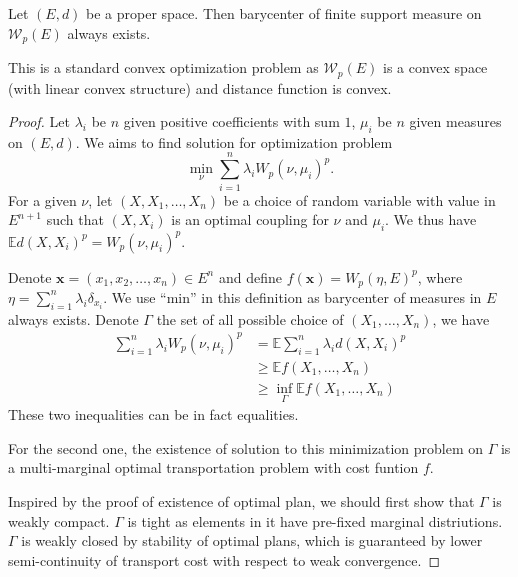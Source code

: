 \begin{thm}
	\label{thm:barycenter_finite_support_measure}
	Let $(E,d)$ be a proper space. Then barycenter of finite support measure on $\mathcal{W}_p(E)$ always exists.
\end{thm}

This is a standard convex optimization problem as $\mathcal{W}_p(E)$ is a convex space (with linear convex structure) and distance function is convex.

\begin{proof}
	Let $\lambda_i$ be $n$ given positive coefficients with sum $1$, $\mu_i$ be $n$ given measures on $(E,d)$. We aims to find solution for optimization problem
	\[
		\min_{\nu} \sum_{i=1}^{n}\lambda_i W_p(\nu, \mu_i)^p.
	\]
	For a given $\nu$, let $(X, X_1,\ldots,X_n)$ be a choice of random variable with value in $E^{n+1}$ such that $(X,X_i)$ is an optimal coupling for $\nu$ and $\mu_i$. We thus have $\mathbb{E}d(X,X_i)^p = W_p(\nu, \mu_i)^p$.

	Denote $\boldsymbol{x}=(x_1, x_2, \ldots, x_n) \in E^n$ and define $f(\boldsymbol{x})= W_p(\eta, E)^p$, where $\eta = \sum_{i=1}^{n} \lambda_i \delta_{x_i}$. We use ``min'' in this definition as barycenter of measures in $E$ always exists. Denote $\Gamma$ the set of all possible choice of $(X_1, \ldots, X_n)$, we have
	\begin{align*}
		\sum_{i=1}^{n}\lambda_i W_p(\nu, \mu_i)^p & = \mathbb{E} \sum_{i=1}^{n}\lambda_i d(X,X_i)^p \\
		                                          & \geq \mathbb{E} f(X_1, \ldots, X_n)             \\
		                                          & \geq \inf_\Gamma \mathbb{E} f(X_1, \ldots, X_n)
	\end{align*}
	These two inequalities can be in fact equalities.

	For the second one, the existence of solution to this minimization problem on $\Gamma$ is a multi-marginal optimal transportation problem with cost funtion $f$.

	Inspired by the proof of existence of optimal plan, we should first show that $\Gamma$ is weakly compact. $\Gamma$ is tight as elements in it have pre-fixed marginal distriutions. $\Gamma$ is weakly closed by stability of optimal plans, which is guaranteed by lower semi-continuity of transport cost with respect to weak convergence.


\end{proof}
